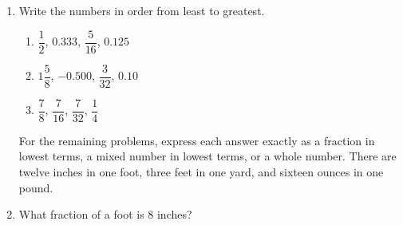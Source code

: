\documentclass[12pt]{article}
\begin{document}
\begin{enumerate}
\begin{multicols}{2}
\begin{enumerate}
  \item \hspace{0.25in} $-3\dfrac{5}{8} \hspace{0.25in} -3.62$
  \vspace{0.25in}

  \item \hspace{0.25in} $0.44 \hspace{0.25in} \dfrac{4}{9}$
  \vspace{0.25in}

  \item \hspace{0.25in} $\dfrac{21}{100} \hspace{0.25in} \dfrac{208}{1000}$
  \vspace{0.25in}

\end{enumerate}
\end{multicols}

  \vspace{0.5in}

\item Write the numbers in order from least to greatest.
\begin{multicols}{2}
\begin{enumerate}

\item \hspace{0.5in} $\dfrac{1}{2}$, $0.333$, $\dfrac{5}{16}$, $0.125$ 
  \vspace{0.5in}

\item \hspace{0.5in} $1\dfrac{5}{8}$, $-0.500$, $\dfrac{3}{32}$, $0.10$ 
  \vspace{0.5in}

\item \hspace{0.5in} $\dfrac{7}{8}$, $\dfrac{7}{16}$, $\dfrac{7}{32}$, $\dfrac{1}{4}$ 
  \vspace{0.5in}

\pagebreak
\end{enumerate}
\end{multicols}

For the remaining problems, express each answer exactly as a fraction in lowest terms, a mixed number in lowest terms, or a whole number. There are twelve inches in one foot, three feet in one yard, and sixteen ounces in one pound.  
\newcommand{\spacing}{\vspace{0.70in}}
\item What fraction of a foot is 8 inches? 
\spacing


\end{enumerate}
\end{document}
